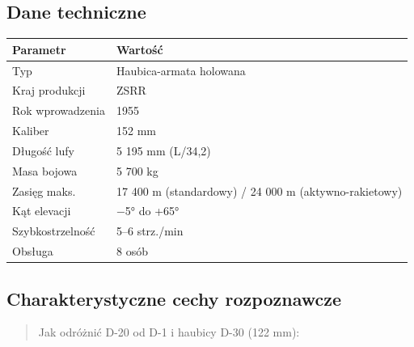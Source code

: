 \documentclass[12pt,oneside]{book}
\begin{document}
\subsection{Dane techniczne}\label{dane-techniczne-30}

\begin{longtable}[]{@{}ll@{}}
\toprule\noalign{}
Parametr & Wartość \\
\midrule\noalign{}
\endhead
\bottomrule\noalign{}
\endlastfoot
Typ & Haubica-armata holowana \\
Kraj produkcji & ZSRR \\
Rok wprowadzenia & 1955 \\
Kaliber & 152 mm \\
Długość lufy & 5 195 mm (L/34,2) \\
Masa bojowa & 5 700 kg \\
Zasięg maks. & 17 400 m (standardowy) / 24 000 m (aktywno-rakietowy) \\
Kąt elevacji & −5° do +65° \\
Szybkostrzelność & 5--6 strz./min \\
Obsługa & 8 osób \\
\end{longtable}

\subsection{Charakterystyczne cechy
rozpoznawcze}\label{charakterystyczne-cechy-rozpoznawcze-30}

\begin{quote}
Jak odróżnić D-20 od D-1 i haubicy D-30 (122 mm):
\end{quote}
\end{document}
